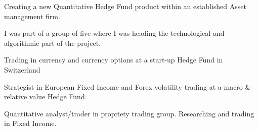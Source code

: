Creating a new Quantitative Hedge Fund product within an established Asset management firm.

I was part of a group of five where I was heading the technological and algorithmic part of the project.


Trading in currency and currency options at a start-up Hedge Fund in Switzerland


Strategist in European Fixed Income and Forex volatility trading at a macro \& relative value Hedge Fund.


Quantitative analyst/trader in propriety trading group. Researching and trading in Fixed Income.
